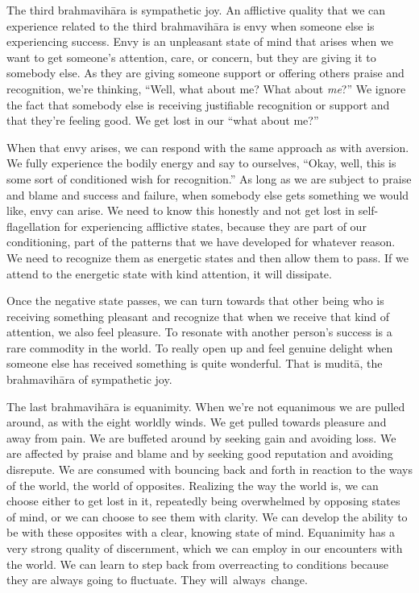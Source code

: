 The third brahmavihāra is sympathetic joy. An afflictive quality that we can experience related to the third brahmavihāra is envy when someone else is experiencing success. Envy is an unpleasant state of mind that arises when we want to get someone's attention, care, or concern, but they are giving it to somebody else. As they are giving someone support or offering others praise and recognition, we're thinking, ``Well, what about me? What about \emph{me}?'' We ignore the fact that somebody else is receiving justifiable recognition or support and that they're feeling good. We get lost in our ``what about me?''

When that envy arises, we can respond with the same approach as with aversion. We fully experience the bodily energy and say to ourselves, ``Okay, well, this is some sort of conditioned wish for recognition.'' As long as we are subject to praise and blame and success and failure, when somebody else gets something we would like, envy can arise. We need to know this honestly and not get lost in self-flagellation for experiencing afflictive states, because they are part of our conditioning, part of the patterns that we have developed for whatever reason. We need to recognize them as energetic states and then allow them to pass. If we attend to the energetic state with kind attention, it will dissipate.

Once the negative state passes, we can turn towards that other being who is receiving something pleasant and recognize that when we receive that kind of attention, we also feel pleasure. To resonate with another person's success is a rare commodity in the world. To really open up and feel genuine delight when someone else has received something is quite wonderful. That is muditā, the brahmavihāra of sympathetic joy.

The last brahmavihāra is equanimity. When we're not equanimous we are pulled around, as with the eight worldly winds. We get pulled towards pleasure and away from pain. We are buffeted around by seeking gain and avoiding loss. We are affected by praise and blame and by seeking good reputation and avoiding disrepute. We are consumed with bouncing back and forth in reaction to the ways of the world, the world of opposites. Realizing the way the world is, we can choose either to get lost in it, repeatedly being overwhelmed by opposing states of mind, or we can choose to see them with clarity. We can develop the ability to be with these opposites with a clear, knowing state of mind. Equanimity has a very strong quality of discernment, which we can employ in our encounters with the world. We can learn to step back from overreacting to conditions because they are always going to fluctuate. They \mbox{will always change.}

